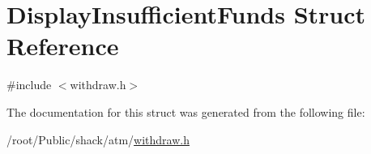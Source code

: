 \hypertarget{structDisplayInsufficientFunds}{\section{Display\-Insufficient\-Funds Struct Reference}
\label{structDisplayInsufficientFunds}
}


{\ttfamily \#include $<$withdraw.\-h$>$}



The documentation for this struct was generated from the following file\-:\begin{DoxyCompactItemize}
\item 
/root/\-Public/shack/atm/\hyperlink{withdraw_8h}{withdraw.\-h}\end{DoxyCompactItemize}
